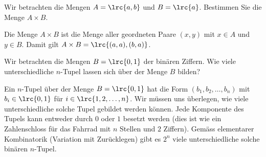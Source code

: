 \begin{myexercise}%
	\noindent
	Wir betrachten die Mengen $A = \lrc{a,b}$ und $B = \lrc{a}$. Bestimmen Sie die Menge $A\times B$.
\end{myexercise}
\begin{myanswer}
	\noindent
	Die Menge $A\times B$ ist die Menge aller geordneten Paare $(x,y)$ mit $x\in A$ und $y\in B$. Damit gilt $A\times B = \lrc{(a,a), (b,a)}$.
\end{myanswer}

\begin{myexercise}%
	\noindent
	Wir betrachten die Mengen $B = \lrc{0,1}$ der binären Ziffern. Wie viele unterschiedliche $n$-Tupel lassen sich über der Menge $B$ bilden?
\end{myexercise}
\begin{myanswer}
	\noindent
	Ein $n$-Tupel über der Menge $B = \lrc{0,1}$ hat die Form $(b_1,b_2,\ldots ,b_n)$ mit $b_i\in\lrc{0,1}$ für $i\in \lrc{1,2,\ldots ,n}$. Wir müssen uns überlegen, wie viele unterschiedliche solche Tupel gebildet werden können. Jede Komponente des Tupels kann entweder durch $0$ oder $1$ besetzt werden (dies ist wie ein Zahlenschloss für das Fahrrad mit $n$ Stellen und $2$ Ziffern). Gemäss elementarer Kombinatorik (Variation mit Zurücklegen) gibt es $2^n$ viele unterschiedliche solche binären $n$-Tupel.
\end{myanswer}

